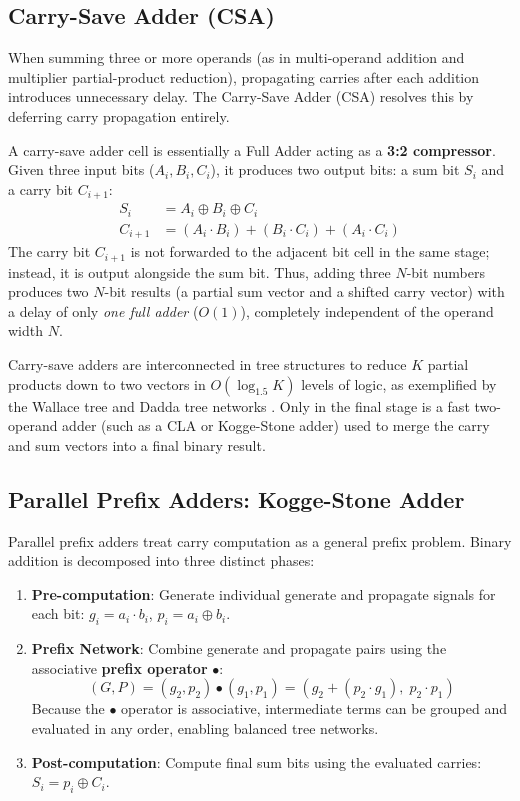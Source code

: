 \subsection{Carry-Save Adder (CSA)}
When summing three or more operands (as in multi-operand addition and multiplier partial-product reduction), propagating carries after each addition introduces unnecessary delay. The Carry-Save Adder (CSA) resolves this by deferring carry propagation entirely.

A carry-save adder cell is essentially a Full Adder acting as a \textbf{3:2 compressor}. Given three input bits ($A_i, B_i, C_i$), it produces two output bits: a sum bit $S_i$ and a carry bit $C_{i+1}$:
\begin{align}
S_i &= A_i \oplus B_i \oplus C_i \\
C_{i+1} &= (A_i \cdot B_i) + (B_i \cdot C_i) + (A_i \cdot C_i)
\end{align}
The carry bit $C_{i+1}$ is not forwarded to the adjacent bit cell in the same stage; instead, it is output alongside the sum bit. Thus, adding three $N$-bit numbers produces two $N$-bit results (a partial sum vector and a shifted carry vector) with a delay of only \textit{one full adder} ($O(1)$), completely independent of the operand width $N$.

Carry-save adders are interconnected in tree structures to reduce $K$ partial products down to two vectors in $O(\log_{1.5} K)$ levels of logic, as exemplified by the Wallace tree and Dadda tree networks \cite{wallace1964, dadda1965}. Only in the final stage is a fast two-operand adder (such as a CLA or Kogge-Stone adder) used to merge the carry and sum vectors into a final binary result.

\subsection{Parallel Prefix Adders: Kogge-Stone Adder} \label{sec:kogge-stone-adder}
Parallel prefix adders treat carry computation as a general prefix problem. Binary addition is decomposed into three distinct phases:
\begin{enumerate}
    \item \textbf{Pre-computation}: Generate individual generate and propagate signals for each bit: $g_i = a_i \cdot b_i$, $p_i = a_i \oplus b_i$.
    \item \textbf{Prefix Network}: Combine generate and propagate pairs using the associative \textbf{prefix operator} $\bullet$:
    \begin{equation}
    (G, P) = (g_2, p_2) \bullet (g_1, p_1) = \left( g_2 + (p_2 \cdot g_1), \; p_2 \cdot p_1 \right)
    \end{equation}
    Because the $\bullet$ operator is associative, intermediate terms can be grouped and evaluated in any order, enabling balanced tree networks.
    \item \textbf{Post-computation}: Compute final sum bits using the evaluated carries: $S_i = p_i \oplus C_i$.
\end{enumerate}

